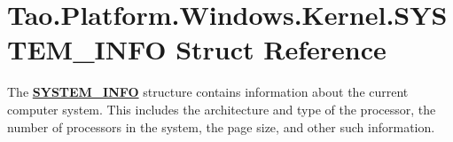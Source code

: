 \hypertarget{struct_tao_1_1_platform_1_1_windows_1_1_kernel_1_1_s_y_s_t_e_m___i_n_f_o}{
\section{Tao.Platform.Windows.Kernel.SYSTEM\_\-INFO Struct Reference}
\label{struct_tao_1_1_platform_1_1_windows_1_1_kernel_1_1_s_y_s_t_e_m___i_n_f_o}
}


The {\bfseries \hyperlink{struct_tao_1_1_platform_1_1_windows_1_1_kernel_1_1_s_y_s_t_e_m___i_n_f_o}{SYSTEM\_\-INFO}} structure contains information about the current computer system. This includes the architecture and type of the processor, the number of processors in the system, the page size, and other such information.  


